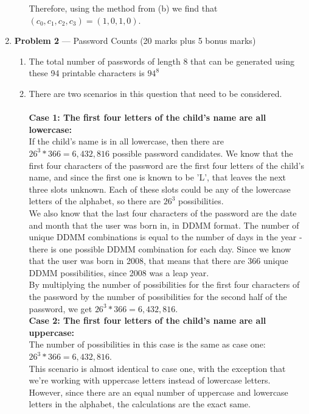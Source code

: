 \documentclass[11pt]{article}
\theoremstyle{definition}
\begin{document}
\begin{enumerate}
\begin{enumerate}
Therefore, using the method from (b) we find that $(c_0, c_1, c_2, c_3) = (1, 0, 1, 0)$.

\end{enumerate}

\newpage

\item[] \textbf{Problem 2} --- Password Counts (20 marks plus 5 bonus marks)

\begin{enumerate}
\item The total number of passwords of length 8 that can be generated using these 94 printable characters is $94^8$

\item There are two scenarios in this question that need to be considered.\\
\\ \textbf{Case 1: The first four letters of the child's name are all lowercase:}\\
If the child's name is in all lowercase, then there are $26^3 * 366 = 6,432,816$ possible password candidates. We know that the first
four characters of the password are the first four letters of the child's name, and since the first one is known to be 'L', that leaves
the next three slots unknown. Each of these slots could be any of the lowercase letters of the alphabet, so there are $26^3$
possibilities.\\

We also know that the last four characters of the password are the date and month that the user was born in, in DDMM format. The number
of unique DDMM combinations is equal to the number of days in the year - there is one possible DDMM combination for each day. Since we know
that the user was born in 2008, that means that there are 366 unique DDMM possibilities, since 2008 was a leap year.\\

By multiplying the number of possibilities for the first four characters of the password by the number of possibilities for the second half of the password,
we get $26^3 * 366 = 6,432,816 $.\\

\textbf{Case 2: The first four letters of the child's name are all uppercase:}\\
The number of possibilities in this case is the same as case one: $26^3 * 366 = 6,432,816$.\\
This scenario is almost identical to case one, with the exception that we're working with uppercase letters instead of lowercase letters. However, since there
are an equal number of uppercase and lowercase letters in the alphabet, the calculations are the exact same.\\


\end{enumerate}
\end{enumerate}
\end{document}

